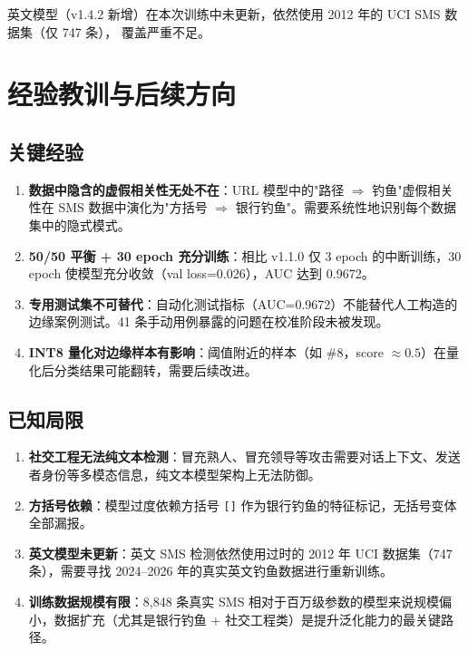 \documentclass[11pt,a4paper]{article}
\begin{document}
英文模型（v1.4.2 新增）在本次训练中未更新，依然使用 2012 年的 UCI SMS 数据集（仅 747 条），
覆盖严重不足。

\section{经验教训与后续方向}

\subsection{关键经验}

\begin{enumerate}
  \item \textbf{数据中隐含的虚假相关性无处不在}：URL 模型中的"路径 $\Rightarrow$ 钓鱼"虚假相关性在 SMS 数据中演化为"方括号 $\Rightarrow$ 银行钓鱼"。需要系统性地识别每个数据集中的隐式模式。
  \item \textbf{50/50 平衡 + 30 epoch 充分训练}：相比 v1.1.0 仅 3 epoch 的中断训练，30 epoch 使模型充分收敛（val loss=0.026），AUC 达到 0.9672。
  \item \textbf{专用测试集不可替代}：自动化测试指标（AUC=0.9672）不能替代人工构造的边缘案例测试。41 条手动用例暴露的问题在校准阶段未被发现。
  \item \textbf{INT8 量化对边缘样本有影响}：阈值附近的样本（如 \#8，score $\approx 0.5$）在量化后分类结果可能翻转，需要后续改进。
\end{enumerate}

\subsection{已知局限}

\begin{enumerate}
  \item \textbf{社交工程无法纯文本检测}：冒充熟人、冒充领导等攻击需要对话上下文、发送者身份等多模态信息，纯文本模型架构上无法防御。
  \item \textbf{方括号依赖}：模型过度依赖方括号 \texttt{[]} 作为银行钓鱼的特征标记，无括号变体全部漏报。
  \item \textbf{英文模型未更新}：英文 SMS 检测依然使用过时的 2012 年 UCI 数据集（747 条），需要寻找 2024--2026 年的真实英文钓鱼数据进行重新训练。
  \item \textbf{训练数据规模有限}：8,848 条真实 SMS 相对于百万级参数的模型来说规模偏小，数据扩充（尤其是银行钓鱼 + 社交工程类）是提升泛化能力的最关键路径。
\end{enumerate}
\end{document}
